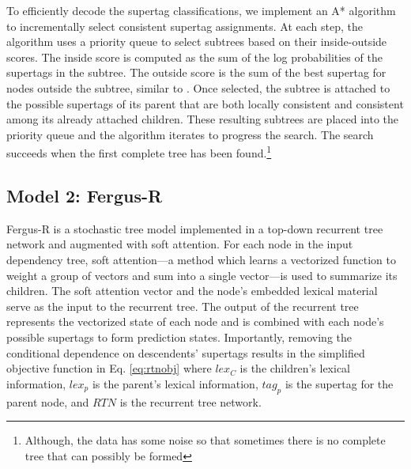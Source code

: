 \documentclass[11pt]{article}
\begin{document}
To efficiently decode the supertag classifications, we implement an A* algorithm to incrementally select consistent supertag assignments.
%
At each step, the algorithm uses a priority queue to select subtrees based on their inside-outside scores.
%
The inside score is computed as the sum of the log probabilities of the supertags in the subtree.
%
The outside score is the sum of the best supertag for nodes outside the subtree, similar to .
%
Once selected, the subtree is attached to the possible supertags of its parent that are both locally consistent and consistent among its already attached children.
%
These resulting subtrees are placed into the priority queue and the algorithm iterates to progress the search.
%
The search succeeds when the first complete tree has been found.\footnote{Although, the data has some noise so that sometimes there is no complete tree that can possibly be formed}

\subsection{Model 2: Fergus-R}

Fergus-R is a stochastic tree model implemented in a top-down recurrent tree network and augmented with soft attention.
%
For each node in the input dependency tree, soft attention---a method which learns a vectorized function to weight a group of vectors and sum into a single vector---is used to summarize its children.
%
The soft attention vector and the node's embedded lexical material serve as the input to the recurrent tree.
%
The output of the recurrent tree represents the vectorized state of each node and is combined with each node's possible supertags to form prediction states.
%
%
%
Importantly, removing the conditional dependence on descendents' supertags
results in the simplified objective function in Eq. \ref{eq:rtnobj} where $lex_C$ is the children's lexical information, $lex_p$ is the parent's lexical information, $tag_p$ is the supertag for the parent node, and $RTN$ is the recurrent tree network. 
\end{document}
